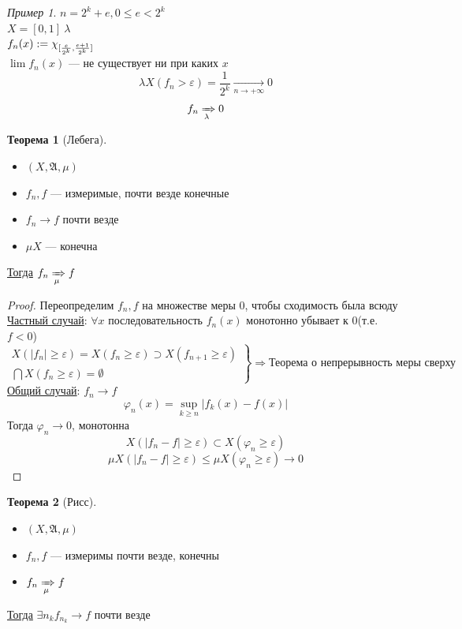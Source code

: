\documentclass[oneside]{book}
\newcommand{\A}{\mathfrak{A}}
\theoremstyle{plain}
\theoremstyle{remark}
\newtheorem*{examp}{Пример}
\theoremstyle{definition}
\newtheorem{theorem}{Теорема}[section]
\begin{document}
\begin{examp}
\(n = 2^k + e, 0 \le e < 2^k\) \\
\(X = [0, 1]\ \lambda\) \\
\(f_n(x) := \chi_{[\frac{e}{2^k}, \frac{e + 1}{2^k}]}\) \\
\(\lim f_n(x)\) --- не существует ни при каких \(x\) \\
\[ \lambda X(f_n > \varepsilon) = \frac{1}{2^k} \xrightarrow[n \to + \infty]{} 0 \]
\[ f_n \xRightarrow[\lambda]{} 0 \]
\end{examp}
\begin{theorem}[Лебега]
\-
\begin{itemize}
\item \((X, \A, \mu)\)
\item \(f_n, f\) --- измеримые, почти везде конечные
\item \(f_n \to f\) почти везде
\item \(\mu X\) --- конечна
\end{itemize}
\uline{Тогда} \(f_n \xRightarrow[\mu]{} f\)
\end{theorem}
\begin{proof}
Переопределим \(f_n, f\) на множестве меры 0, чтобы сходимость была всюду
\uline{Частный случай}: \(\forall x\) последовательность \(f_n(x)\) монотонно убывает к 0(т.е. \(f < 0\))
\[ \left.\begin{array}{cc}X(|f_n| \ge \varepsilon) = X(f_n \ge \varepsilon) \supset X(f_{n + 1} \ge \varepsilon) \\ \bigcap X(f_n \ge \varepsilon) = \emptyset \end{array}\right\} \Rightarrow \text{Теорема о непрерывность меры сверху}\]
\uline{Общий случай}: \(f_n \to f\)
\[ \varphi_n(x) = \sup_{k \ge n}|f_k(x) - f(x)| \]
Тогда \(\varphi_n \to 0\), монотонна
\[ X(|f_n - f| \ge \varepsilon) \subset X(\varphi_n \ge \varepsilon) \]
\[ \mu X(|f_n - f| \ge \varepsilon) \le \mu X(\varphi_n \ge \varepsilon) \to 0 \]
\end{proof}
\begin{theorem}[Рисс]
\-
\begin{itemize}
\item \((X, \A, \mu)\)
\item \(f_n, f\) --- измеримы почти везде, конечны
\item \(f_n \xRightarrow[\mu]{} f\)
\end{itemize}
\uline{Тогда} \(\exists n_k f_{n_k} \to f\) почти везде
\end{theorem}
\end{document}
